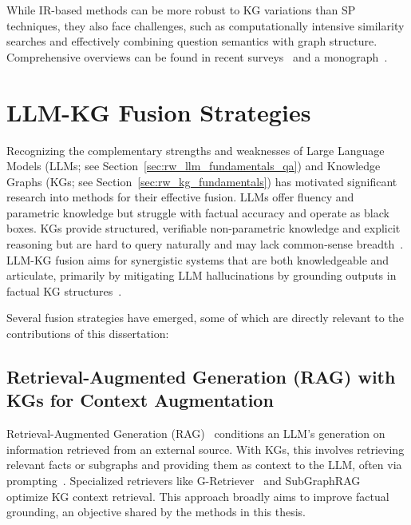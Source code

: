 While IR-based methods can be more robust to KG variations than SP techniques, they also face challenges, such as computationally intensive similarity searches and effectively combining question semantics with graph structure. Comprehensive overviews can be found in recent surveys~\cite{chakraborty2021introduction, complex_kbqa} and a monograph~\cite{roy-anand-2021}.

\section{LLM-KG Fusion Strategies}
\label{sec:rw_fusion_strategies}

Recognizing the complementary strengths and weaknesses of Large Language Models (LLMs; see Section~\ref{sec:rw_llm_fundamentals_qa}) and Knowledge Graphs (KGs; see Section~\ref{sec:rw_kg_fundamentals}) has motivated significant research into methods for their effective fusion. LLMs offer fluency and parametric knowledge but struggle with factual accuracy and operate as black boxes. KGs provide structured, verifiable non-parametric knowledge and explicit reasoning but are hard to query naturally and may lack common-sense breadth~\cite{DBLP:conf/acl/MallenAZDKH23}. LLM-KG fusion aims for synergistic systems that are both knowledgeable and articulate, primarily by mitigating LLM hallucinations by grounding outputs in factual KG structures~\cite{DBLP:journals/tkde/PanLWCWW24, DBLP:conf/ijcai/0001LW0S0Y24}.

Several fusion strategies have emerged, some of which are directly relevant to the contributions of this dissertation:

\subsection{Retrieval-Augmented Generation (RAG) with KGs for Context Augmentation}
Retrieval-Augmented Generation (RAG)~\cite{DBLP:conf/nips/LewisPPPKGKLYR020-rag} conditions an LLM's generation on information retrieved from an external source. With KGs, this involves retrieving relevant facts or subgraphs and providing them as context to the LLM, often via prompting~\cite{DBLP:conf/emnlp/KnowledgeAugmented}. Specialized retrievers like G-Retriever~\cite{DBLP:conf/nips/He0SC0LBH24} and SubGraphRAG~\cite{DBLP:conf/iclr/Li0025} optimize KG context retrieval. This approach broadly aims to improve factual grounding, an objective shared by the methods in this thesis.

